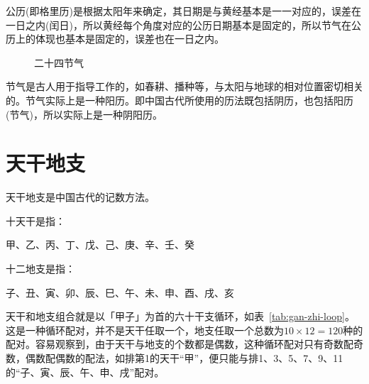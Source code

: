 公历(即格里历)是根据太阳年来确定，其日期是与黄经基本是一一对应的，误差在一日之内(闰日)，所以黄经每个角度对应的公历日期基本是固定的，所以节气在公历上的体现也基本是固定的，误差也在一日之内。

\begin{figure}[htbp]
  \centering
  \caption{二十四节气}
  \label{fig:24-jie-qi}
\end{figure}

节气是古人用于指导工作的，如春耕、播种等，与太阳与地球的相对位置密切相关的。节气实际上是一种阳历。即中国古代所使用的历法既包括阴历，也包括阳历(节气)，所以实际上是一种阴阳历。


\section{天干地支}
\label{sec:gan-zhi}

天干地支是中国古代的记数方法。

\begin{definition}[天干]
  十天干是指：\nopagebreak

  \centering
  甲、乙、丙、丁、戊、己、庚、辛、壬、癸
\end{definition}

\begin{definition}[地支]
  十二地支是指：\nopagebreak

  \centering
  子、丑、寅、卯、辰、巳、午、未、申、酉、戌、亥
\end{definition}

天干和地支组合就是以「甲子」为首的六十干支循环，如表~\ref{tab:gan-zhi-loop}。这是一种循环配对，并不是天干任取一个，地支任取一个总数为$10\times12=120$种的配对。容易观察到，由于天干与地支的个数都是偶数，这种循环配对只有奇数配奇数，偶数配偶数的配法，如排第1的天干“甲”，便只能与排1、3、5、7、9、11的“子、寅、辰、午、申、戌”配对。

